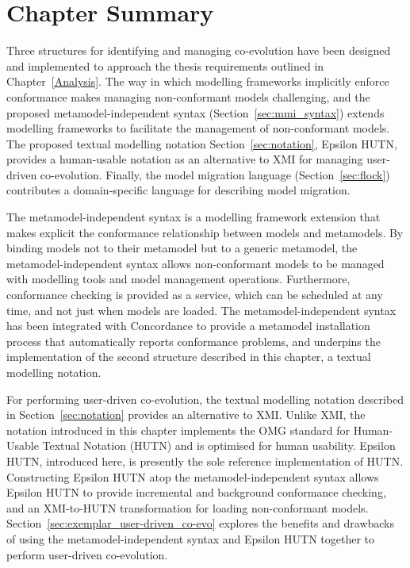 \section{Chapter Summary}
Three structures for identifying and managing co-evolution have been designed and implemented to approach the thesis requirements outlined in Chapter~\ref{Analysis}. The way in which modelling frameworks implicitly enforce conformance makes managing non-conformant models challenging, and the proposed metamodel-independent syntax (Section~\ref{sec:mmi_syntax}) extends modelling frameworks to facilitate the management of non-conformant models. The proposed textual modelling notation Section~\ref{sec:notation}, Epsilon HUTN, provides a human-usable notation as an alternative to XMI for managing user-driven co-evolution. Finally, the model migration language (Section~\ref{sec:flock}) contributes a domain-specific language for describing model migration.

The metamodel-independent syntax is a modelling framework extension that makes explicit the conformance relationship between models and metamodels. By binding models not to their metamodel but to a generic metamodel, the metamodel-independent syntax allows non-conformant models to be managed with modelling tools and model management operations. Furthermore, conformance checking is provided as a service, which can be scheduled at any time, and not just when models are loaded. The metamodel-independent syntax has been integrated with Concordance \cite{rose10concordance} to provide a metamodel installation process that automatically reports conformance problems, and underpins the implementation of the second structure described in this chapter, a textual modelling notation.

For performing user-driven co-evolution, the textual modelling notation described in Section~\ref{sec:notation} provides an alternative to XMI. Unlike XMI, the notation introduced in this chapter implements the OMG standard for Human-Usable Textual Notation (HUTN) \cite{hutn} and is optimised for human usability. Epsilon HUTN, introduced here, is presently the sole reference implementation of HUTN. Constructing Epsilon HUTN atop the metamodel-independent syntax allows Epsilon HUTN to provide incremental and background conformance checking, and an XMI-to-HUTN transformation for loading non-conformant models. Section~\ref{sec:exemplar_user-driven_co-evo} explores the benefits and drawbacks of using the metamodel-independent syntax and Epsilon HUTN together to perform user-driven co-evolution.

